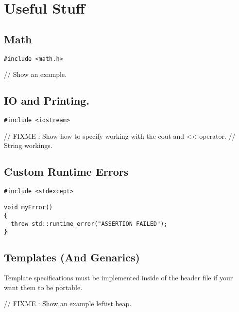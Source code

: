 \documentclass[12pt, letterpaper]{article}
\begin{document}
\section{Useful Stuff}

\subsection{Math}

\begin{verbatim}
#include <math.h>
\end{verbatim}

// Show an example.

\subsection{IO and Printing.}

\begin{verbatim}
#include <iostream>

\end{verbatim}

// FIXME : Show how to specify working with the cout and << operator.
// String workings.

\subsection{Custom Runtime Errors}

\begin{verbatim}
#include <stdexcept>

void myError()
{
  throw std::runtime_error("ASSERTION FAILED");
}

\end{verbatim}

\subsection{Templates (And Genarics)}

Template specifications must be implemented inside of the header file if your want them to be portable.

// FIXME : Show an example leftist heap.

\end{document}
